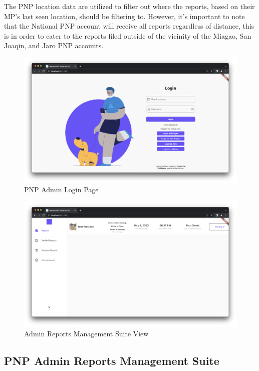 The PNP location data are utilized to filter out where the reports, based on their MP's last seen location, should be filtering to. However, it's important to note that the National PNP account will receive all reports regardless of distance, this is in order to cater to the reports filed outside of the vicinity of the Miagao, San Joaqin, and  Jaro PNP accounts.

\begin{figure}[!h]
    \centering
    \includegraphics[scale=0.25]{figures/Chapter4/PNP/Login.png}
    \caption{PNP Admin Login Page}
    \label{fig:PNP1}
\end{figure}

\begin{figure}[!h]
    \centering
    \includegraphics[scale=0.25]{figures/Chapter4/PNP/NavigationTab.png}
    \caption{Admin Reports Management Suite View}
    \label{fig:PNP2}
\end{figure}
\subsection{PNP Admin Reports Management Suite}

